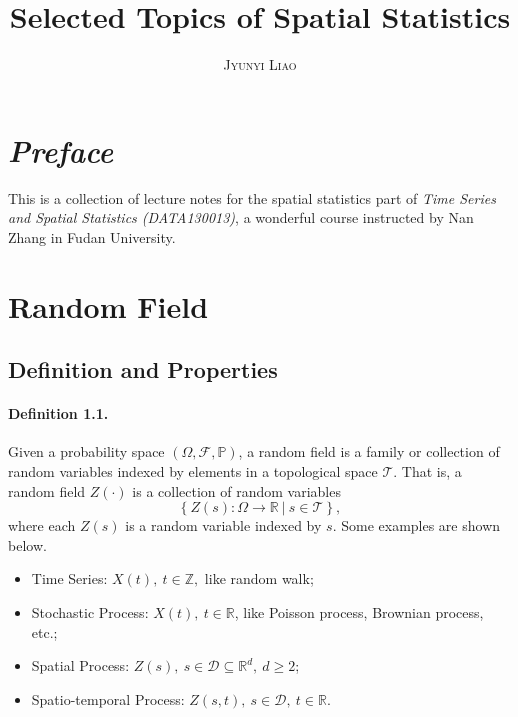 \documentclass{article}
\title{\bf Selected Topics of Spatial Statistics}
\author{\textsc{Jyunyi Liao}}
\date{}
\begin{document}
\maketitle
\section*{\it Preface}
This is a collection of lecture notes for the spatial statistics part of \textit{Time Series and Spatial Statistics (DATA130013)}, a wonderful course instructed by Nan Zhang in Fudan University.

\tableofcontents
\newpage

\section{Random Field}
\subsection{Definition and Properties}
\paragraph{Definition 1.1.} Given a probability space $(\Omega, \mathcal{F},\mathbb{P})$, a random field is a family or collection of random variables indexed by elements in a topological space $\mathcal{T}$. That is, a random field $Z(\cdot)$ is a collection of random variables
\begin{equation*}
	\left\lbrace Z(s): \Omega\to\mathbb{R} \ \vert\ s\in\mathcal{T}\right\rbrace,\tag{1.1}
\end{equation*}
where each $Z(s)$ is a random variable indexed by $s$.  Some examples are shown below.
\begin{itemize}
	\item Time Series: $X(t),\ t\in\mathbb{Z},$ like random walk;
	\item Stochastic Process: $X(t),\ t\in\mathbb{R}$, like Poisson process, Brownian process, etc.;
	\item Spatial Process: $Z(s),\ s\in\mathcal{D}\subseteq \mathbb{R}^d,\ d\geq 2$;
	\item Spatio-temporal Process: $Z(s,t),\ s\in\mathcal{D},\ t\in\mathbb{R}$.
\end{itemize}
\end{document}

